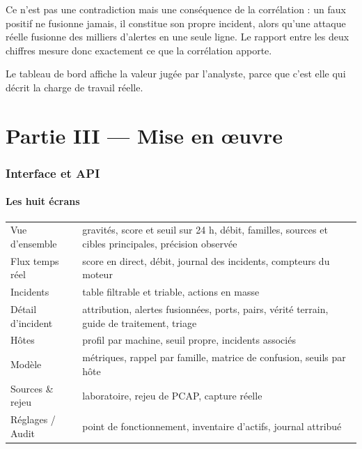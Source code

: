 \documentclass[11pt,a4paper]{article}
\begin{document}
Ce n'est pas une contradiction mais une conséquence de la corrélation : un faux positif ne fusionne
jamais, il constitue son propre incident, alors qu'une attaque réelle fusionne des milliers
d'alertes en une seule ligne. Le rapport entre les deux chiffres mesure donc exactement ce que la
corrélation apporte.

Le tableau de bord affiche la valeur jugée par l'analyste, parce que c'est elle qui décrit la charge
de travail réelle.

\clearpage
\part*{Partie III --- Mise en \oe{}uvre}

\section{Interface et API}

\subsection{Les huit écrans}

\begin{table}[h]\centering\small
\begin{tabularx}{\linewidth}{@{}l X@{}}
\toprule
Vue d'ensemble & gravités, score et seuil sur 24 h, débit, familles, sources et cibles
principales, précision observée \\
Flux temps réel & score en direct, débit, journal des incidents, compteurs du moteur \\
Incidents & table filtrable et triable, actions en masse \\
Détail d'incident & attribution, alertes fusionnées, ports, pairs, vérité terrain, guide de
traitement, triage \\
Hôtes & profil par machine, seuil propre, incidents associés \\
Modèle & métriques, rappel par famille, matrice de confusion, seuils par hôte \\
Sources \& rejeu & laboratoire, rejeu de PCAP, capture réelle \\
Réglages / Audit & point de fonctionnement, inventaire d'actifs, journal attribué \\
\bottomrule
\end{tabularx}
\end{table}
\end{document}
